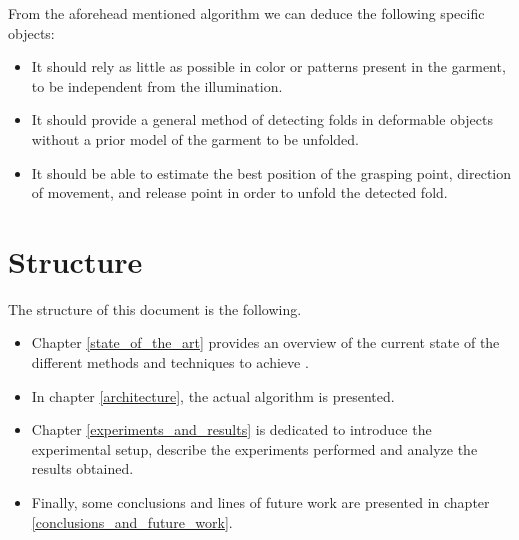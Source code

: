 From the aforehead mentioned algorithm we can deduce the following specific objects:

\begin{itemize}
	\item It should rely as little as possible in color or patterns present in the garment, to be independent from the illumination.
	\item It should provide a general method of detecting folds in deformable objects without a prior model of the garment to be unfolded.
	\item It should be able to estimate the best position of the grasping point, direction of movement, and release point in order to unfold the detected fold.
\end{itemize}


\section{Structure}
\label{intro_structure}

The structure of this document is the following. 

\begin{itemize}
\item Chapter \ref{state_of_the_art} provides an overview of the current state of the different methods and techniques to achieve .
\item In chapter \ref{architecture}, the actual algorithm is presented. 
\item Chapter \ref{experiments_and_results} is dedicated to introduce the experimental setup, describe the experiments performed and analyze the results obtained.
\item Finally, some conclusions and lines of future work are presented in chapter \ref{conclusions_and_future_work}.

\end{itemize}
